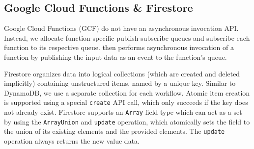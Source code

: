 \subsection{Google Cloud Functions \& Firestore}

Google Cloud Functions (GCF) do not have an asynchronous invocation API.
Instead, we allocate function-specific publish-subscribe queues and subscribe
each function to its respective queue.  \name{} then performs asynchronous
invocation of a function by publishing the input data as an event to the
function's queue.

Firestore organizes data into logical collections (which are created and deleted
implicitly) containing unstructured items, named by a unique key. Similar to
DynamoDB, we use a separate collection for each workflow. Atomic item creation
is supported using a special \texttt{create} API call, which only succeeds if
the key does not already exist. Firestore supports an \texttt{Array} field type
which can act as a set by using the \texttt{ArrayUnion} and \texttt{update}
operation, which atomically sets the field to the union of its existing elements
and the provided elements. The \texttt{update} operation always returns the
new value data.
